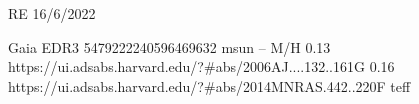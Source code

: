 RE 16/6/2022

Gaia EDR3 5479222240596469632
msun
--
M/H
0.13 https://ui.adsabs.harvard.edu/?#abs/2006AJ....132..161G
0.16	https://ui.adsabs.harvard.edu/?#abs/2014MNRAS.442..220F
teff 
